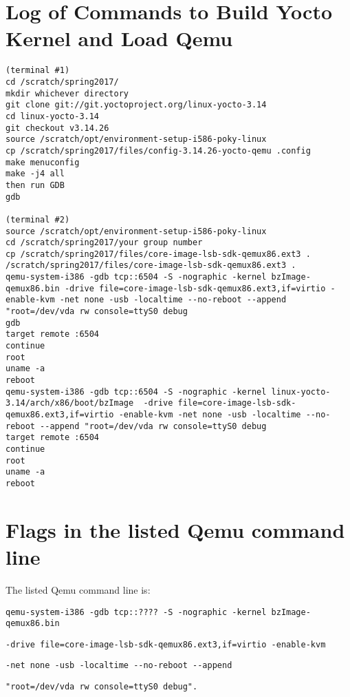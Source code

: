 \documentclass[letterpaper,10pt,titlepage]{article}
\begin{document}
\section{Log of Commands to Build Yocto Kernel and Load Qemu}
\begin{lstlisting}
(terminal #1)
cd /scratch/spring2017/
mkdir whichever directory
git clone git://git.yoctoproject.org/linux-yocto-3.14
cd linux-yocto-3.14
git checkout v3.14.26
source /scratch/opt/environment-setup-i586-poky-linux
cp /scratch/spring2017/files/config-3.14.26-yocto-qemu .config
make menuconfig
make -j4 all
then run GDB
gdb

(terminal #2)
source /scratch/opt/environment-setup-i586-poky-linux
cd /scratch/spring2017/your group number
cp /scratch/spring2017/files/core-image-lsb-sdk-qemux86.ext3 .
/scratch/spring2017/files/core-image-lsb-sdk-qemux86.ext3 .
qemu-system-i386 -gdb tcp::6504 -S -nographic -kernel bzImage-qemux86.bin -drive file=core-image-lsb-sdk-qemux86.ext3,if=virtio -enable-kvm -net none -usb -localtime --no-reboot --append "root=/dev/vda rw console=ttyS0 debug
gdb
target remote :6504
continue
root
uname -a
reboot
qemu-system-i386 -gdb tcp::6504 -S -nographic -kernel linux-yocto-3.14/arch/x86/boot/bzImage  -drive file=core-image-lsb-sdk-qemux86.ext3,if=virtio -enable-kvm -net none -usb -localtime --no-reboot --append "root=/dev/vda rw console=ttyS0 debug
target remote :6504
continue
root
uname -a
reboot
\end{lstlisting}

\section{Flags in the listed Qemu command line}
The listed Qemu command line is:
\begin{lstlisting}
qemu-system-i386 -gdb tcp::???? -S -nographic -kernel bzImage-qemux86.bin 
\end{lstlisting}
\begin{lstlisting}
-drive file=core-image-lsb-sdk-qemux86.ext3,if=virtio -enable-kvm 
\end{lstlisting}
\begin{lstlisting}
-net none -usb -localtime --no-reboot --append 
\end{lstlisting}
\begin{lstlisting}
"root=/dev/vda rw console=ttyS0 debug".
\end{lstlisting}
\end{document}
